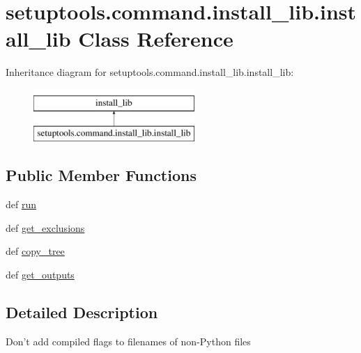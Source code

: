 \hypertarget{classsetuptools_1_1command_1_1install__lib_1_1install__lib}{}\section{setuptools.\+command.\+install\+\_\+lib.\+install\+\_\+lib Class Reference}
\label{classsetuptools_1_1command_1_1install__lib_1_1install__lib}
Inheritance diagram for setuptools.\+command.\+install\+\_\+lib.\+install\+\_\+lib\+:\begin{figure}[H]
\begin{center}
\leavevmode
\includegraphics[height=2.000000cm]{classsetuptools_1_1command_1_1install__lib_1_1install__lib}
\end{center}
\end{figure}
\subsection*{Public Member Functions}
\begin{DoxyCompactItemize}
\item 
def \hyperlink{classsetuptools_1_1command_1_1install__lib_1_1install__lib_a375d83b569dbcb1793dc5212cea2ac23}{run}
\item 
def \hyperlink{classsetuptools_1_1command_1_1install__lib_1_1install__lib_ae5993aef9b30ca23351801f42adb1809}{get\+\_\+exclusions}
\item 
def \hyperlink{classsetuptools_1_1command_1_1install__lib_1_1install__lib_afd4d3667c718e4a56a4373ff5cd9f28a}{copy\+\_\+tree}
\item 
def \hyperlink{classsetuptools_1_1command_1_1install__lib_1_1install__lib_a8dc14c45227950a1bbdcfffa1f8e4c79}{get\+\_\+outputs}
\end{DoxyCompactItemize}


\subsection{Detailed Description}
\begin{DoxyVerb}Don't add compiled flags to filenames of non-Python files\end{DoxyVerb}
 

